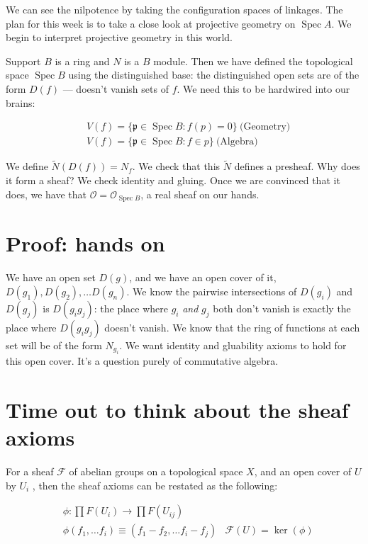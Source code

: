 \documentclass{book}
\newcommand{\F}{\ensuremath{\mathcal{F}}}
\renewcommand{\O}{\ensuremath{\mathcal{O}}}
\newcommand{\spec}{\operatorname{Spec}}
\newcommand{\p}{\mathfrak{p}}
\theoremstyle{definition}
\begin{document}
We can see the nilpotence by taking the configuration spaces of linkages.
The plan for this week is to take a close look at projective geometry
on $\spec A$. We begin to interpret projective geometry in this world.

Support $B$ is a ring and $N$ is a $B$ module. Then we have defined the topological
space $\spec B$ using the distinguished base: the distinguished open sets
are of the form $D(f)$ --- doesn't vanish sets of $f$. We need this
to be hardwired into our brains:

\begin{align*}
&V(f) = \{ \p \in \spec B : f(p) = 0 \} ~ \text{(Geometry)} \\
&V(f) = \{ \p \in \spec B : f \in p \} ~ \text{(Algebra)}
\end{align*}

We define $\tilde N(D(f)) = N_f$. We check that this $\tilde N$ defines
a presheaf.  Why does it form a sheaf? We check identity and gluing. Once
we are convinced that it does, we have that $\O = \O_{\spec B}$, a real 
sheaf on our hands.

\section{Proof: hands on}

We have an open set $D(g)$, and we have an open cover of it, $D(g_1), D(g_2), \dots D(g_n)$.
We know the pairwise intersections of $D(g_i)$ and $D(g_j)$ is $D(g_i g_j)$: 
the place where $g_i$ \emph{and} $g_j$ both don't vanish is exactly the place
where $D(g_i g_j)$ doesn't vanish. We know that the ring of functions
at each set will be of the form $N_{g_i}$. We want identity and
gluability axioms to hold for this open cover. It's a question purely
of commutative algebra.

\section{Time out to think about the sheaf axioms}
For a sheaf $\F$ of abelian groups on a topological space $X$, and an open
cover of $U$ by $U_i$ , then the sheaf axioms can be restated as the following:

\begin{align*}
&\phi: \prod F(U_i) \rightarrow \prod F(U_{ij}) \\
&\phi(f_1, \dots f_i) \equiv (f_1 - f_2, \dots f_i - f_j)
&\F(U) = \ker(\phi)
\end{align*}
\end{document}
